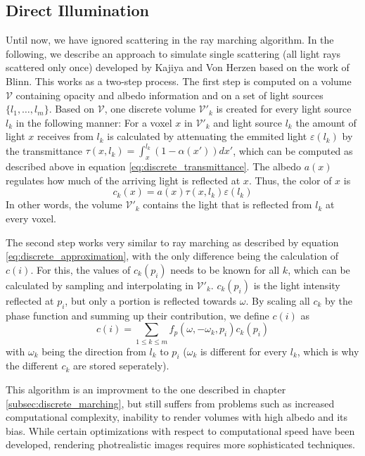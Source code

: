 \subsection{Direct Illumination}\label{subsec:direct_illumination}
Until now, we have ignored scattering in the ray marching algorithm. In the following, we describe an approach to simulate single scattering (all light rays scattered only once) developed by Kajiya and Von Herzen\cite{10.1145/964965.808594} based on the work of Blinn\cite{10.1145/965145.801255}.
This works as a two-step process.
The first step is computed on a volume $\mathcal{V}$ containing opacity and albedo information and on a set of light sources $\{l_1, \ldots, l_m\}$.
Based on $\mathcal{V}$, one discrete volume $\mathcal{V}'_k$ is created for every light source $l_k$ in the following manner:
For a voxel ${x}$ in $\mathcal{V}'_k$ and light source $l_k$ the amount of light ${x}$ receives from $l_k$ is calculated by attenuating the emmited light $\varepsilon(l_k)$ by the transmittance $\tau({x}, l_k) = \int_{{x}}^{l_k}(1 - \alpha({x'}))d{x'}$, which can be computed as described above in equation \ref{eq:discrete_transmittance}.
 The albedo $a({x})$ regulates how much of the arriving light is reflected at ${x}$. Thus, the color of ${x}$ is
\begin{equation}
c_k({x}) = a({x}) \tau({x}, l_k) \varepsilon(l_k)
\end{equation}
In other words, the volume $\mathcal{V}'_k$ contains the light that is reflected from $l_k$ at every voxel.

The second step works very similar to ray marching as described by equation \ref{eq:discrete_approximation}, with the only difference being the calculation of $c(i)$. For this, the values of $c_k(p_i)$ needs to be known for all $k$, which can be calculated by sampling and interpolating in $\mathcal{V}'_k$.
$c_k(p_i)$ is the light intensity reflected at $p_i$, but only a portion is reflected towards $\omega$. By scaling all $c_k$ by the phase function and summing up their contribution, we define $c(i)$ as
\begin{equation}
c(i) = \sum_{1 \le k \le m} f_p(\omega, -\omega_k, p_i)c_k(p_i)
\end{equation}
with $\omega_k$ being the direction from $l_k$ to $p_i$ ($\omega_k$ is different for every $l_k$, which is why the different $c_k$ are stored seperately).


This algorithm is an improvment to the one described in chapter \ref{subsec:discrete_marching}, but still suffers from problems such as increased computational complexity, inability to render volumes with high albedo \cite{10.1145/964965.808594} and its bias\cite{10.1145/3451256}. While certain optimizations with respect to computational speed have been developed\cite{10.1145/78964.78965, 10.1145/147130.147155}, rendering photrealistic images requires more sophisticated techniques.










